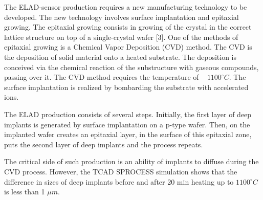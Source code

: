 
The ELAD-sensor production requires a new manufacturing technology to be developed. 
The new technology involves surface implantation and epitaxial growing. 
The epitaxial growing consists in growing of the crystal in the correct lattice structure on top of a single-crystal wafer [3]. 
One of the methods of epitaxial growing is a Chemical Vapor Deposition (CVD) method. The CVD is the deposition of solid material onto a heated substrate. 
The deposition is conceived via the chemical reaction of the substructure with gaseous compounds, passing over it. 
The  CVD method requires the temperature of ~ $1100^\circ C$. The surface implantation is realized by bombarding the substrate with accelerated ions.

The ELAD production consists of several steps. Initially, the first layer of deep implants is generated by surface implantation on a p-type wafer. 
Then, on the implanted wafer creates an epitaxial layer, in the surface of this epitaxial zone, puts the second layer of deep implants and the process repeats. 

The critical side of such production is an ability of implants to diffuse during the CVD process. 
However, the TCAD SPROCESS simulation shows that the difference in sizes of deep implants before and after 20 min heating up to $1100^\circ C$ is less than 1 $\mu m$.
